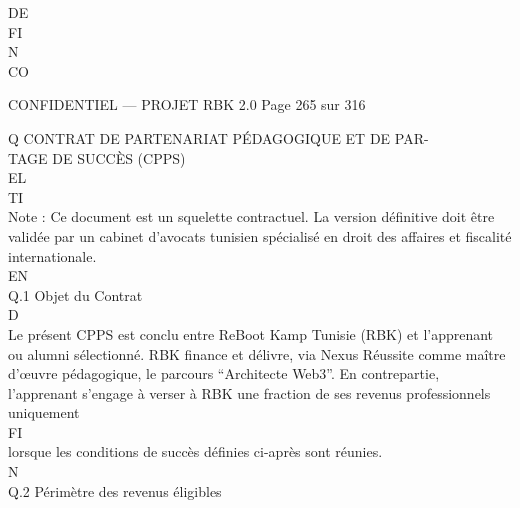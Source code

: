 DE\\
FI\\
N\\
CO\\
\vspace{0.5em}
\vspace{0.5em}
\vspace{0.5em}
\vspace{0.5em}
\begin{confidential}CONFIDENTIEL — PROJET RBK 2.0                                   Page 265 sur 316\end{confidential}
Q \textbar{} CONTRAT DE PARTENARIAT PÉDAGOGIQUE ET DE PAR-\\
TAGE DE SUCCÈS (CPPS)\\
\vspace{0.5em}
\vspace{0.5em}
\vspace{0.5em}
\vspace{0.5em}
EL\\
TI\\
Note : Ce document est un squelette contractuel. La version définitive doit être validée par un cabinet d’avocats tunisien spécialisé en droit des affaires et fiscalité internationale.\\
\vspace{0.5em}
\vspace{0.5em}
\vspace{0.5em}
\vspace{0.5em}
EN\\
Q.1 Objet du Contrat\\
\vspace{0.5em}
\vspace{0.5em}
\vspace{0.5em}
\vspace{0.5em}
D\\
Le présent CPPS est conclu entre ReBoot Kamp Tunisie (RBK) et l’apprenant ou alumni sélectionné. RBK finance et délivre, via Nexus Réussite comme maître\\
d’œuvre pédagogique, le parcours “Architecte Web3”. En contrepartie, l’apprenant s’engage à verser à RBK une fraction de ses revenus professionnels uniquement\\
\vspace{0.5em}
\vspace{0.5em}
FI\\
lorsque les conditions de succès définies ci-après sont réunies.\\
N\\
Q.2 Périmètre des revenus éligibles\\
